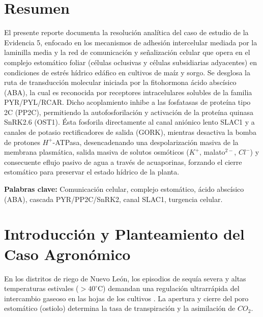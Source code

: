 \documentclass[spanish,letterpaper,oneside]{article}
\begin{document}
\hypersetup{pageanchor=false}
\begingroup
\fontsize{14}{17}\selectfont
\renewcommand{\Huge}{\fontsize{14}{17}\selectfont\bfseries}
\renewcommand{\large}{\fontsize{14}{17}\selectfont}
\templatePortrait
\clearpage
\endgroup
\hypersetup{pageanchor=true}
\templatePagecfg
\singlespacing
\setlength{\tabcolsep}{8pt}
\renewcommand{\arraystretch}{1.18}

\section*{Resumen}
El presente reporte documenta la resolución analítica del caso de estudio de la Evidencia 5, enfocado en los mecanismos de adhesión intercelular mediada por la laminilla media y la red de comunicación y señalización celular que opera en el complejo estomático foliar (células oclusivas y células subsidiarias adyacentes) en condiciones de estrés hídrico edáfico en cultivos de maíz y sorgo. Se desglosa la ruta de transducción molecular iniciada por la fitohormona ácido abscísico (ABA), la cual es reconocida por receptores intracelulares solubles de la familia PYR/PYL/RCAR. Dicho acoplamiento inhibe a las fosfatasas de proteína tipo 2C (PP2C), permitiendo la autofosforilación y activación de la proteína quinasa SnRK2.6 (OST1). Ésta fosforila directamente al canal aniónico lento SLAC1 y a canales de potasio rectificadores de salida (GORK), mientras desactiva la bomba de protones $H^+$-ATPasa, desencadenando una despolarización masiva de la membrana plasmática, salida masiva de solutos osmóticos ($K^+$, malato$^{2-}$, $Cl^-$) y consecuente eflujo pasivo de agua a través de acuaporinas, forzando el cierre estomático para preservar el estado hídrico de la planta.

\vspace{0.4cm}
\noindent\textbf{Palabras clave:} Comunicación celular, complejo estomático, ácido abscísico (ABA), cascada PYR/PP2C/SnRK2, canal SLAC1, turgencia celular.

\section{Introducción y Planteamiento del Caso Agronómico}
En los distritos de riego de Nuevo León, los episodios de sequía severa y altas temperaturas estivales ($>40^\circ\text{C}$) demandan una regulación ultrarrápida del intercambio gaseoso en las hojas de los cultivos \parencite{taiz2015}. La apertura y cierre del poro estomático (ostiolo) determina la tasa de transpiración y la asimilación de $CO_2$.
\end{document}
